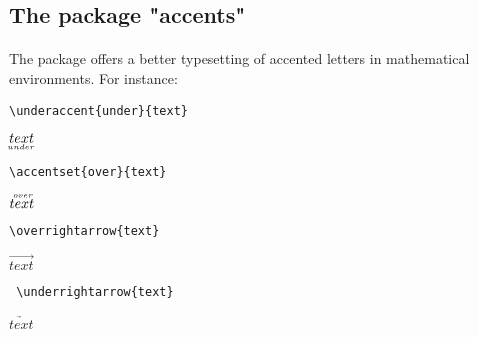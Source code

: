 \subsection{The package "accents"}
\paragraph*{}
The package  offers a better typesetting of accented letters in mathematical environments. For instance:

\begin{center}
\begin{minipage}[l]{.4\textwidth}
\begin{verbatim}
\underaccent{under}{text}
\end{verbatim}
\end{minipage}
\begin{minipage}[r]{.2\textwidth}
$\underaccent{under}{text}$
\end{minipage}\vspace{.5cm}

\begin{minipage}[l]{.4\textwidth}
\begin{verbatim}
\accentset{over}{text}
\end{verbatim}
\end{minipage}
\begin{minipage}[r]{.2\textwidth}
$\accentset{over}{text}$
\end{minipage}\vspace{.5cm}

\begin{minipage}[l]{.4\textwidth}
\begin{verbatim}
\overrightarrow{text}
\end{verbatim}
\end{minipage}
\begin{minipage}[r]{.2\textwidth}
$\overrightarrow{text}$
\end{minipage}\vspace{.5cm}

\begin{minipage}[l]{.4\textwidth}
\begin{verbatim}
 \underrightarrow{text}
\end{verbatim}
\end{minipage}
\begin{minipage}[r]{.2\textwidth}
$\underrightarrow{text}$
\end{minipage}\vspace{.5cm}


\end{center}
